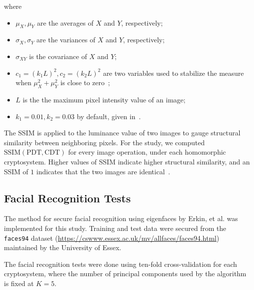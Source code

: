 \begin{description}
	where
	\begin{itemize}
		\item $\mu_X, \mu_Y$ are the averages of $X$ and $Y$, respectively;
		\item $\sigma_X, \sigma_Y$ are the variances of $X$ and $Y$, respectively;
		\item $\sigma_{XY}$ is the covariance of $X$ and $Y$;
		\item $c_1 = (k_1L)^2, c_2 = (k_2L)^2$ are two variables used to stabilize the measure when $\mu_X^2+\mu_Y^2$ is close to zero~\cite{akramullah_video_2014};
		\item $L$ is the the maximum pixel intensity value of an image;
		\item $k_1 = 0.01, k_2 = 0.03$ by default, given in~\cite{ahmed_benchmark_2016}.
	\end{itemize}
	The SSIM is applied to the luminance value of two images to gauge structural similarity between neighboring pixels.
    For the study, we computed $\mathrm{SSIM}(\mathrm{PDT}, \mathrm{CDT})$ for every image operation, under each homomorphic cryptosystem. Higher values of SSIM indicate higher structural similarity, and an SSIM of $1$ indicates that the two images are identical~\cite{ahmed_benchmark_2016}.
\end{description}

\subsection{Facial Recognition Tests}
The method for secure facial recognition using eigenfaces by Erkin, et al. \cite{hutchison_privacy-preserving_2009-2} was implemented for this study.
Training and test data were secured from the \texttt{faces94} dataset (\url{https://cswww.essex.ac.uk/mv/allfaces/faces94.html}) maintained by the University of Essex. 



The facial recognition tests were done using ten-fold cross-validation for each cryptosystem, where the number of principal components used by the algorithm is fixed at $K=5$. 

